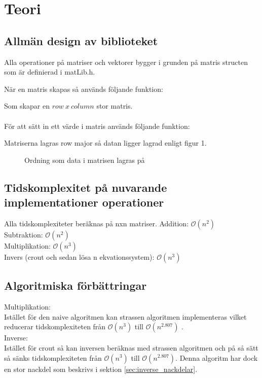 \section{Teori}

\subsection{Allmän design av biblioteket}
Alla operationer på matriser och vektorer bygger i grunden på matris structen som är definierad i matLib.h.

När en matris skapas så används följande funktion:

Som skapar en $row \ x \ column$ stor matris. \\ \\
För att sätt in ett värde i matris används följande funktion:

Matriserna lagras row major så datan ligger lagrad enligt figur 1. 
\begin{figure}[h]
\center
\scalebox{0.8}{}
\caption{Ordning som data i matrisen lagras på}
\end{figure}


\subsection{Tidskomplexitet på nuvarande implementationer operationer}
Alla tidskomplexiteter beräknas på nxn matriser.
Addition: $\mathcal{O}(n^2)$\\
Subtraktion: $\mathcal{O}(n^2)$\\
Multiplikation: $\mathcal{O}(n^3)$\\
Invers (crout och sedan lösa n ekvationssystem): $\mathcal{O}(n^3)$\\ 

\subsection{Algoritmiska förbättringar}
Multiplikation:\\
Istället för den naive algoritmen kan strassen algoritmen implementeras vilket reducerar tidskomplexiteten från $\mathcal{O}(n^3)$ till $\mathcal{O}(n^{2.807})$ \cite{Strassen1969}. \\
Inverse:\\
Istället för crout så kan inversen beräknas med strassen algoritmen och på så sätt så sänks tidskomplexiteten från $\mathcal{O}(n^3)$ till $\mathcal{O}(n^{2.807})$. Denna algoritm har dock en stor nackdel som beskrivs i sektion \ref{sec:inverse_nackdelar}.

